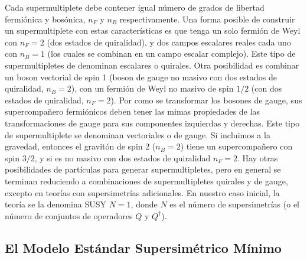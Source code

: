 Cada supermultiplete debe contener igual número de grados de libertad fermiónica y bosónica, $n_F$ y $n_B$ respectivamente. Una forma posible de construir un supermultiplete con estas características es que tenga un solo fermión de Weyl con $n_F=2$ (dos estados de quiralidad),
y dos campos escalares reales cada uno con $n_B=1$ (los cuales se combinan en un campo escalar complejo). Este tipo de supermultipletes de denominan escalares o quirales. Otra posibilidad es combinar un boson vectorial de spin 1 (boson de gauge no masivo con dos estados de quiralidad, $n_B=2$), con un fermión de Weyl no masivo de spin $1/2$ (con dos estados de quiralidad, $n_F=2$). Por como se transformar los bosones de gauge, sus supercompañero fermiónicos deben tener las mimas propiedades de las transformaciones de gauge para sus componentes izquierdas y derechas. Este tipo de supermultiplete se denominan vectoriales o de gauge. 
Si incluimos a la gravedad, entonces el gravitón \cite{Anduaga:1433401} de spin 2 ($n_B=2$) tiene un supercompañero con spin $3/2$, y si es no masivo con dos estados de quiralidad $n_F=2$. 
Hay otras posibilidades de partículas para generar supermultipletes, pero en general se terminan reduciendo a combinaciones de supermultipletes quirales y de gauge, excepto en teorías con supersimetrías adicionales. En nuestro caso inicial, la teoría se la denomina SUSY $N=1$, donde $N$ es el número de supersimetrías (o el número de conjuntos de operadores $Q$ y $Q^{\dagger}$). 

\subsection{El Modelo Estándar Supersimétrico Mínimo}

